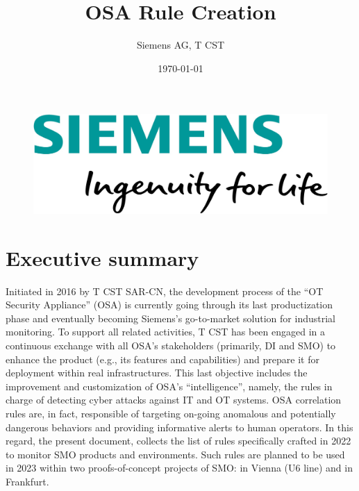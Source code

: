 \documentclass[a4paper]{report}
\title{OSA Rule Creation}
\date{\today}
\author{Siemens AG, T CST}
\makeatletter
\renewcommand{\maketitle}{\bgroup\setlength{\parindent}{0pt}

   \begingroup\centering

  {\Huge\textbf{\@title}} \vspace{2ex}

  {\large\@author} \vspace{2ex}

  {\@date} \vspace{2ex}

   \endgroup

}
\makeatother
\begin{document}
\begin{figure}
    \begin{flushright}
        \includegraphics[scale=0.2]{images/SiemensLogo.jpg}
        \label{img:siemens_logo}
    \end{flushright}
\end{figure}

\vspace*{5cm}

\maketitle

\newpage

\section*{\center Executive summary}
\markboth{}{}

Initiated in 2016 by T CST SAR-CN, the development process of the ``OT Security Appliance'' (OSA) is currently going through its last productization phase and eventually becoming Siemens's go-to-market solution for industrial monitoring. To support all related activities, T CST has been engaged in a continuous exchange with all OSA's stakeholders (primarily, DI and SMO) to enhance the product (e.g., its features and capabilities) and prepare it for deployment within real infrastructures. This last objective includes the improvement and customization of OSA's ``intelligence'', namely, the rules in charge of detecting cyber attacks against IT and OT systems. OSA correlation rules are, in fact, responsible of targeting on-going anomalous and potentially dangerous behaviors and providing informative alerts to human operators. In this regard, the present document, collects the list of rules specifically crafted in 2022 to monitor SMO products and environments. Such rules are planned to be used in 2023 within two proofs-of-concept projects of SMO: in Vienna (U6 line) and in Frankfurt.

\end{document}
